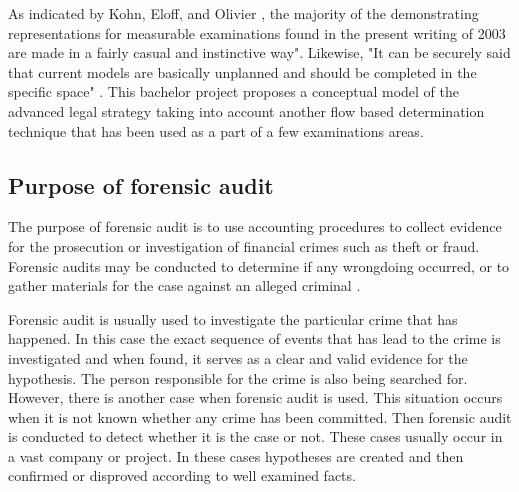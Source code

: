 As indicated by Kohn, Eloff, and Olivier \cite{6}, the majority of the demonstrating representations for measurable examinations found in the present writing  of 2003 are made in a fairly casual and instinctive way". Likewise, "It can be securely said that current models are basically unplanned and should be completed in the specific space" \cite{4}. This bachelor project proposes a conceptual model of the advanced legal strategy taking into account another flow based determination technique that has been used as a part of a few examinations areas.





\subsection{Purpose of forensic audit} 
The purpose of forensic audit is to use accounting procedures to collect evidence for the prosecution or investigation of financial crimes such as theft or fraud. Forensic audits may be conducted to determine if any wrongdoing occurred, or to gather materials for the case against an alleged criminal \cite{x1}.


Forensic audit is usually used to investigate the particular crime that has happened. In this case the exact sequence of events that has lead to the crime is investigated and when found, it serves as a clear and valid evidence for the hypothesis. The person responsible for the crime is also being searched for. However, there is another case when forensic audit is used. This situation occurs when it is not known whether any crime has been committed. Then forensic audit is conducted to detect whether it is the case or not. These cases usually occur in a vast company or project. In these cases hypotheses are created and then confirmed or disproved according to well examined facts.


